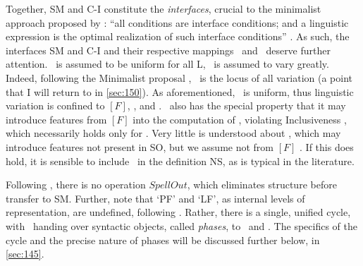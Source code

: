Together, SM and C-I constitute the \textit{interfaces}, crucial to the minimalist approach proposed by \textcite{ChomskyN_1993}: ``all conditions are interface conditions; and a linguistic expression is the optimal realization of such interface conditions'' \parencite[26]{ChomskyN_1993}. As such, the interfaces SM and C-I and their respective mappings \fSM\ and \fCI\ deserve further attention. \fCI\ is assumed to be uniform for all L, \fSM\ is assumed to vary greatly. Indeed, following the Minimalist proposal , \fSM\ is the locus of all variation (a point that I will return to in \autoref{sec:150}). As aforementioned, \CHL\ is uniform, thus linguistic variation is confined to $[F]$, \Lex, and \fSM. \fSM\ also has the special property that it may introduce features from $[F]$ into the computation of \PHON, violating Inclusiveness , which necessarily holds only for \CHL. Very little is understood about \fCI, which may introduce features not present in SO, but we assume not from $[F]$ \parencite[107]{ChomskyN_2004}. If this does hold, it is sensible to include \fCI\ in the definition NS, as is typical in the literature.

Following \textcite[241]{ChomskyN.etal_2019}, there is no operation $SpellOut$, which eliminates structure before transfer to SM. Further, note that `PF' and `LF', as internal levels of representation, are undefined, following \textcite[107]{ChomskyN_2004}. Rather, there is a single, unified cycle, with \TRANSFER\ handing over syntactic objects, called \textit{phases}, to \fSM\ and \fCI. The specifics of the cycle and the precise nature of phases will be discussed further below, in \autoref{sec:145}.

